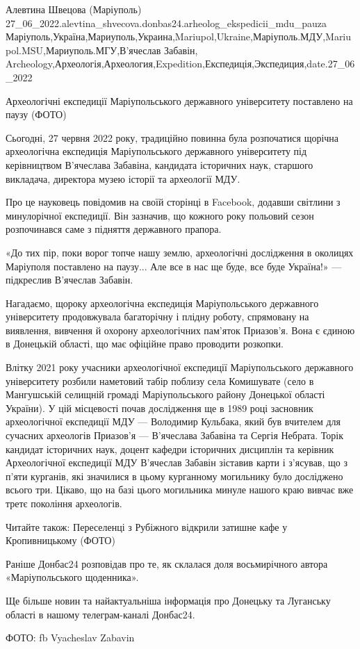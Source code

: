  
 
 
 
 

Алевтина Швецова (Маріуполь)
27_06_2022.alevtina_shvecova.donbas24.arheolog_ekspedicii_mdu_pauza
Маріуполь,Україна,Мариуполь,Украина,Mariupol,Ukraine,Маріуполь.МДУ,Mariupol.MSU,Мариуполь.МГУ,В'ячеслав Забавін,
Archeology,Археологія,Археология,Expedition,Експедиція,Экспедиция,date.27_06_2022

Археологічні експедиції Маріупольського державного університету поставлено на
паузу (ФОТО)

Сьогодні, 27 червня 2022 року, традиційно повинна була розпочатися щорічна
археологічна експедиція Маріупольського державного університету під
керівництвом В'ячеслава Забавіна, кандидата історичних наук, старшого
викладача, директора музею історії та археології МДУ.

Про це науковець повідомив на своїй сторінці в Facebook, додавши світлини з
минулорічної експедиції. Він зазначив, що кожного року польовий сезон
розпочинався саме з підняття державного прапора.

«До тих пір, поки ворог топче нашу землю, археологічні дослідження в околицях
Маріуполя поставлено на паузу... Але все в нас ще буде, все буде Україна!» —
підкреслив В'ячеслав Забавін.

Нагадаємо, щороку археологічна експедиція Маріупольського державного
університету продовжувала багаторічну і плідну роботу, спрямовану на виявлення,
вивчення й охорону археологічних пам'яток Приазов'я. Вона є єдиною в Донецькій
області, що має офіційне право проводити розкопки.

Влітку 2021 року учасники археологічної експедиції Маріупольського державного
університету розбили наметовий табір поблизу села Комишувате (село в
Мангушській селищній громаді Маріупольського району Донецької області України).
У цій місцевості почав дослідження ще в 1989 році засновник археологічної
експедиції МДУ — Володимир Кульбака, який був вчителем для сучасних археологів
Приазов'я — В'ячеслава Забавіна та Сергія Небрата. Торік кандидат історичних
наук, доцент кафедри історичних дисциплін та керівник Археологічної експедиції
МДУ В'ячеслав Забавін зіставив карти і з'ясував, що з п'яти курганів, які
значилися в цьому курганному могильнику було досліджено всього три. Цікаво, що
на базі цього могильника минуле нашого краю вивчає вже третє покоління
археологів.

Читайте також: Переселенці з Рубіжного відкрили затишне кафе у Кропивницькому
(ФОТО)

Раніше Донбас24 розповідав про те, як склалася доля восьмирічного автора
«Маріупольського щоденника».

Ще більше новин та найактуальніша інформація про Донецьку та Луганську області
в нашому телеграм-каналі Донбас24.

ФОТО: fb Vyacheslav Zabavin
